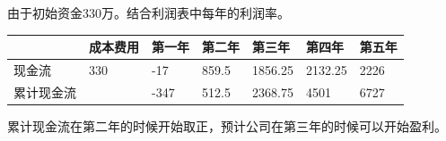 \documentclass[master]{hduthesis}
\begin{document}
由于初始资金330万。结合利润表中每年的利润率。
\begin{table}[H]
	\centering
	\begin{tabular}{|l|l|l|l|l|l|l|}
	\hline
		  & 成本费用 & 第一年  & 第二年   & 第三年     & 第四年     & 第五年  \\ \hline
	现金流   & 330  & -17  & 859.5 & 1856.25 & 2132.25 & 2226 \\ \hline
	累计现金流 &      & -347 & 512.5 & 2368.75 & 4501    & 6727 \\ \hline
	\end{tabular}
	\end{table}
	累计现金流在第二年的时候开始取正，预计公司在第三年的时候可以开始盈利。
\end{document}
